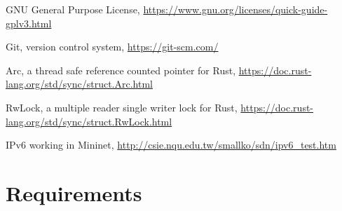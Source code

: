 \documentclass[12pt,a4paper,twoside,openany]{report}
\begin{document}
\begin{thebibliography}{1}
 GNU General Purpose License, \url{https://www.gnu.org/licenses/quick-guide-gplv3.html}

 Git, version control system, \url{https://git-scm.com/}

 Arc, a thread safe reference counted pointer for Rust, \url{https://doc.rust-lang.org/std/sync/struct.Arc.html}

RwLock, a multiple reader single writer lock for Rust, \url{https://doc.rust-lang.org/std/sync/struct.RwLock.html}

 IPv6 working in Mininet, \url{http://csie.nqu.edu.tw/smallko/sdn/ipv6_test.htm}

\end{thebibliography}

\appendix

\chapter{Requirements}
\label{appendix::requirements}

\end{document}

